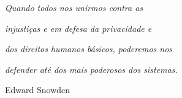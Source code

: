$\!$\\
$\!$\\
$\!$\\
$\!$\\
$\!$\\
$\!$\\
$\!$\\
$\!$\\
$\!$\\
$\!$\\
$\!$\\
$\!$\\
$\!$\\
$\!$\\
$\!$\\
$\!$\\
$\!$\\
$\!$\\
$\!$\\
$\!$\\
$\!$\\
$\!$\\
$\!$\\
$\!$\\
$\!$\\


\begin{flushright}
\textit{Quando todos nos unirmos contra as}
\end{flushright}
\vspace{-1cm}
\begin{flushright}
\textit{injustiças e em defesa da privacidade e}
\end{flushright}
\vspace{-1cm}
\begin{flushright}
\textit{dos direitos humanos básicos, poderemos nos}
\end{flushright}
\vspace{-1cm}
\begin{flushright}
\textit{defender até dos mais poderosos dos sistemas.}
\end{flushright}
\begin{flushright}
Edward Snowden
\end{flushright}
\thispagestyle{empty}
